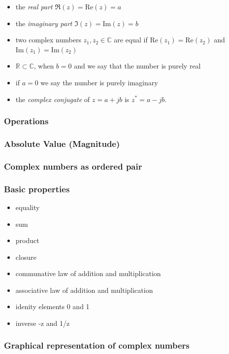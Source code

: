\documentclass{article}
\begin{document}
\begin{itemize}
\item the \emph{real part} $\Re(z) = \text{Re}(z) = a$
\item the \emph{imaginary part} $\Im(z) = \text{Im}(z) = b$
\item two complex numbers $z_1, z_2\in \mathbb{C}$ are equal if $\text{Re}(z_1) = \text{Re}(z_2)$ and $\text{Im}(z_1) = \text{Im}(z_2)$
\item $\mathbb{R} \subset \mathbb{C}$, when $b = 0$ and we say that the number is purely real
\item if $a = 0$ we say the number is purely imaginary
\item the \emph{complex conjugate} of $z = a + jb$ is $z^* = a - jb$.
\end{itemize}

\subsubsection{Operations}


\subsubsection{Absolute Value (Magnitude)}

\subsubsection{Complex numbers as ordered pair}

\subsubsection{Basic properties}

\begin{itemize}
\item equality
\item sum
\item product
\item closure
\item communative law of addition and multiplication
\item associative law of addition and multiplication
\item idenity elements 0 and 1
\item inverse -z and 1/z
\end{itemize}
\subsubsection{Graphical representation of complex numbers}
\end{document}
